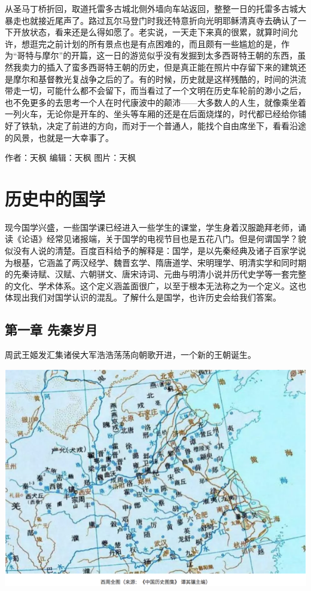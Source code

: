 \documentclass[
]{book}
\begin{document}
从圣马丁桥折回，取道托雷多古城北侧外墙向车站返回，整整一日的托雷多古城大暴走也就接近尾声了。路过瓦尔马登门时我还特意折向光明耶稣清真寺去确认了一下开放状态，看来还是么得如愿了。老实说，一天走下来真的很累，就算时间允许，想逛完之前计划的所有景点也是有点困难的，而且颇有一些尴尬的是，作为``哥特与摩尔''的开篇，这一日的游览似乎没有发掘到太多西哥特王朝的东西，虽然我卖力的插入了蛮多西哥特王朝的历史，但是真正能在照片中存留下来的建筑还是摩尔和基督教光复战争之后的了。有的时候，历史就是这样残酷的，时间的洪流带走一切，可能什么都不会留下，而当看过了一个文明在历史车轮前的渺小之后，也不免更多的去思考一个人在时代康波中的颠沛------大多数人的人生，就像乘坐着一列火车，无论你是开车的、坐头等车厢的还是在后面烧煤的，时代都已经给你铺好了铁轨，决定了前进的方向，而对于一个普通人，能找个自由席坐下，看看沿途的风景，也就是一大幸事了。

作者：天枫
编辑：天枫
图片：天枫

\hypertarget{ux5386ux53f2ux4e2dux7684ux56fdux5b66}{%
\section{历史中的国学}\label{ux5386ux53f2ux4e2dux7684ux56fdux5b66}}

现今国学兴盛，一些国学课已经进入一些学生的课堂，学生身着汉服跪拜老师，诵读《论语》经常见诸报端，关于国学的电视节目也是五花八门。但是何谓国学？貌似没有人说的清楚。百度百科给予的解释是：国学，是以先秦经典及诸子百家学说为根基，它涵盖了两汉经学、魏晋玄学、隋唐道学、宋明理学、明清实学和同时期的先秦诗赋、汉赋、六朝骈文、唐宋诗词、元曲与明清小说并历代史学等一套完整的文化、学术体系。这个定义涵盖面很广，以至于根本无法称之为一个定义。这也体现出我们对国学认识的混乱。了解什么是国学，也许历史会给我们答案。

\hypertarget{ux7b2cux4e00ux7ae0-ux5148ux79e6ux5c81ux6708}{%
\subsection{第一章 先秦岁月}\label{ux7b2cux4e00ux7ae0-ux5148ux79e6ux5c81ux6708}}

周武王姬发汇集诸侯大军浩浩荡荡向朝歌开进，一个新的王朝诞生。

\includegraphics[width=8.33in]{images/gx1}
\end{document}
